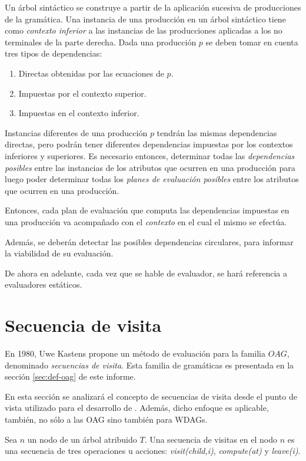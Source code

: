 Un árbol sintáctico se construye a partir de la aplicación sucesiva de producciones de la
gramática. Una instancia de una producción en un árbol sintáctico tiene como
\emph{contexto inferior} a las instancias de las producciones aplicadas a los no terminales de la parte derecha.
Dada una producción $p$ se deben tomar en cuenta tres tipos de dependencias:
\begin{enumerate}
\item Directas obtenidas por las ecuaciones de $p$.
\item Impuestas por el contexto superior.
\item Impuestas en el contexto inferior.
\end{enumerate}

Instancias diferentes de una producción $p$ tendrán las mismas dependencias directas, pero podrán tener diferentes dependencias impuestas por los contextos inferiores y superiores. Es necesario entonces, determinar todas las \emph{dependencias posibles} entre las instancias de los atributos que ocurren en una producción para luego poder determinar todas los \emph{planes de evaluación posibles} entre los atributos que ocurren en una producción.

Entonces, cada plan de evaluación que computa las dependencias impuestas en una producción va acompañado con el \textit{contexto} en el cual el mismo se efectúa.

Además, se deberán detectar las posibles dependencias circulares, para informar la viabilidad de su evaluación.

De ahora en adelante, cada vez que se hable de evaluador, se hará referencia a evaluadores estáticos.

\section{Secuencia de visita}
\label{sec:sec-visit}
En 1980, Uwe Kastens propone un método de evaluación para la familia $OAG$, denominado \emph{secuencias de visita}\cite{kastens}. Esta familia de gramáticas es presentada en la sección \ref{sec:def-oag} de este informe.

En esta sección se analizará el concepto de secuencias de visita desde el punto de vista utilizado para el desarrollo de \maggen. Además, dicho enfoque es aplicable, también, no sólo a las OAG sino también para WDAGs.

Sea $n$ un nodo de un árbol atribuido $T$. 
Una secuencia de visitas en el nodo $n$ es una secuencia de tres operaciones u acciones: 
\emph{visit(child,i)}, \emph{compute(at)} y \emph{leave(i)}.

